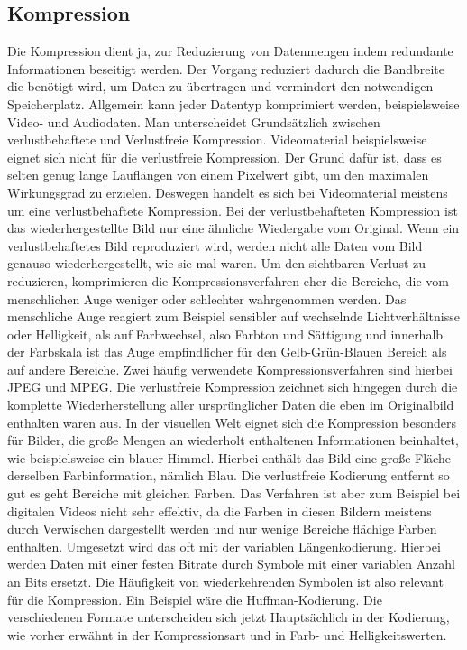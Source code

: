 \documentclass[conference]{IEEEtran}
\begin{document}
\subsection{Kompression}
Die Kompression dient ja, zur Reduzierung von Datenmengen indem redundante Informationen beseitigt werden. Der Vorgang reduziert dadurch die Bandbreite die benötigt wird, um Daten zu übertragen und vermindert den notwendigen Speicherplatz. Allgemein kann jeder Datentyp komprimiert werden, beispielsweise Video- und Audiodaten. Man unterscheidet Grundsätzlich zwischen verlustbehaftete und Verlustfreie Kompression.
Videomaterial beispielsweise eignet sich nicht für die verlustfreie Kompression. Der Grund dafür ist, dass es selten genug lange Lauflängen von  einem Pixelwert gibt, um den maximalen Wirkungsgrad zu erzielen. Deswegen handelt es sich bei Videomaterial meistens um eine verlustbehaftete Kompression. Bei der verlustbehafteten Kompression ist das wiederhergestellte Bild nur eine ähnliche Wiedergabe vom Original. Wenn ein verlustbehaftetes Bild reproduziert wird, werden nicht alle Daten vom Bild genauso wiederhergestellt, wie sie mal waren. Um den sichtbaren Verlust zu reduzieren, komprimieren die Kompressionsverfahren eher die Bereiche, die vom menschlichen Auge weniger oder schlechter wahrgenommen werden. Das menschliche Auge reagiert zum Beispiel sensibler auf wechselnde Lichtverhältnisse oder Helligkeit, als auf Farbwechsel, also Farbton und Sättigung und innerhalb der Farbskala ist das Auge empfindlicher für den Gelb-Grün-Blauen Bereich als auf andere Bereiche. Zwei häufig verwendete Kompressionsverfahren sind hierbei JPEG und MPEG.
Die verlustfreie Kompression zeichnet sich hingegen durch die komplette Wiederherstellung aller ursprünglicher Daten die eben im Originalbild enthalten waren aus. In der visuellen Welt eignet sich die Kompression besonders für Bilder, die große Mengen an wiederholt enthaltenen Informationen beinhaltet, wie beispielsweise ein blauer Himmel. Hierbei enthält das Bild eine große Fläche derselben Farbinformation, nämlich Blau. Die verlustfreie Kodierung entfernt so gut es geht Bereiche mit gleichen Farben. Das Verfahren ist aber zum Beispiel bei digitalen Videos nicht sehr effektiv, da die Farben in diesen Bildern meistens durch Verwischen dargestellt werden und nur wenige Bereiche flächige Farben enthalten.
Umgesetzt wird das oft mit der variablen Längenkodierung. Hierbei werden Daten mit einer festen Bitrate durch Symbole mit einer variablen Anzahl an Bits ersetzt. Die Häufigkeit von wiederkehrenden Symbolen ist also relevant für die Kompression. Ein Beispiel wäre die Huffman-Kodierung.
Die verschiedenen Formate unterscheiden sich jetzt Hauptsächlich in der Kodierung, wie vorher erwähnt in der Kompressionsart und in Farb- und Helligkeitswerten.
\end{document}
